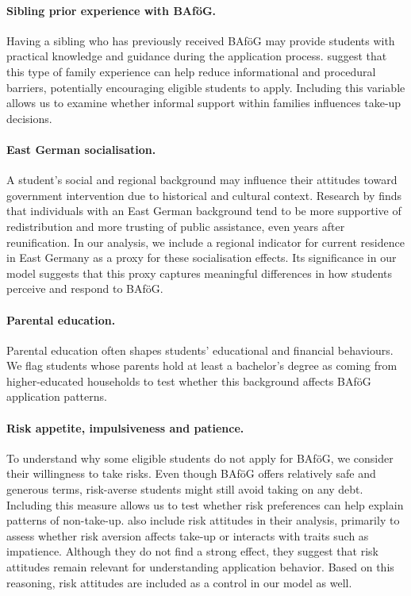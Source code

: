 \paragraph{Sibling prior experience with BAföG.}
Having a sibling who has previously received BAföG may provide students with practical knowledge and guidance during the application process. \cite{herber_non-take-up_2019} suggest that this type of family experience can help reduce informational and procedural barriers, potentially encouraging eligible students to apply. Including this variable allows us to examine whether informal support within families influences take-up decisions.

\paragraph{East German socialisation.}  
A student’s social and regional background may influence their attitudes toward government intervention due to historical and cultural context. Research by \cite{alesina_good-bye_2007} finds that individuals with an East German background tend to be more supportive of redistribution and more trusting of public assistance, even years after reunification. In our analysis, we include a regional indicator for current residence in East Germany as a proxy for these socialisation effects. Its significance in our model suggests that this proxy captures meaningful differences in how students perceive and respond to BAföG.

\paragraph{Parental education.}  
Parental education often shapes students’ educational and financial behaviours. We flag students whose parents hold at least a bachelor’s degree as coming from higher-educated households to test whether this background affects BAföG application patterns.

\paragraph{Risk appetite, impulsiveness and patience.}  

To understand why some eligible students do not apply for BAföG, we consider their willingness to take risks. Even though BAföG offers relatively safe and generous terms, risk-averse students might still avoid taking on any debt. Including this measure allows us to test whether risk preferences can help explain patterns of non-take-up. \cite{herber_non-take-up_2019} also include risk attitudes in their analysis, primarily to assess whether risk aversion affects take-up or interacts with traits such as impatience. Although they do not find a strong effect, they suggest that risk attitudes remain relevant for understanding application behavior. Based on this reasoning, risk attitudes are included as a control in our model as well.

